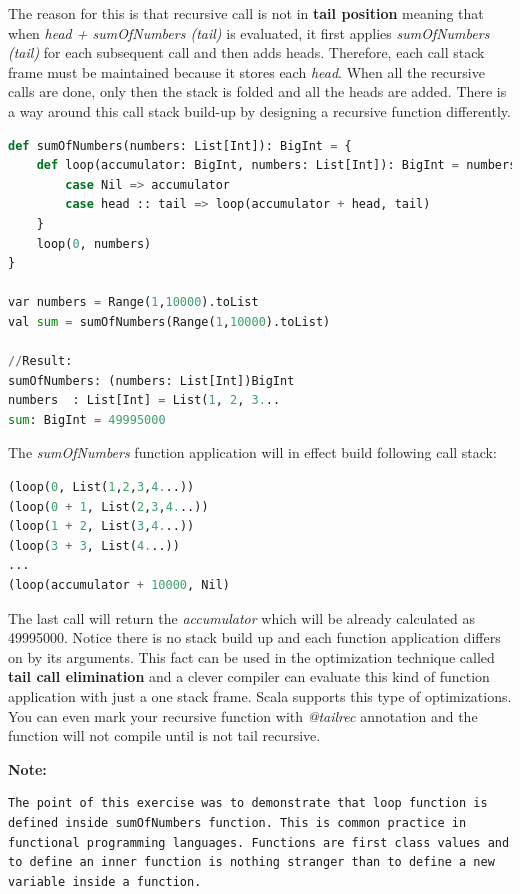 \documentclass[12pt,twoside,a4paper]{report}
\begin{document}
The reason for this is that recursive call is not in \textbf{tail position} meaning that when \emph{head + sumOfNumbers (tail)} is evaluated, it first applies \emph{sumOfNumbers (tail)} for each subsequent call and then adds heads. Therefore, each call stack frame must be maintained because it stores each \emph{head}. When all the recursive calls are done, only then the stack is folded and all the heads are added. There is a way around this call stack build-up by designing a recursive function differently.
\begin{lstlisting}[language=python]
def sumOfNumbers(numbers: List[Int]): BigInt = {
    def loop(accumulator: BigInt, numbers: List[Int]): BigInt = numbers match {
        case Nil => accumulator
        case head :: tail => loop(accumulator + head, tail)
    }
    loop(0, numbers)
}
  
var numbers = Range(1,10000).toList
val sum = sumOfNumbers(Range(1,10000).toList)

//Result:
sumOfNumbers: (numbers: List[Int])BigInt
numbers  : List[Int] = List(1, 2, 3...
sum: BigInt = 49995000
\end{lstlisting}

The \emph{sumOfNumbers} function application will in effect build following call stack:
\begin{lstlisting}[language=python]
(loop(0, List(1,2,3,4...))
(loop(0 + 1, List(2,3,4...))
(loop(1 + 2, List(3,4...))
(loop(3 + 3, List(4...))
...
(loop(accumulator + 10000, Nil)
\end{lstlisting}

The last call will return the \emph{accumulator} which will be already calculated as 49995000. Notice there is no stack build up and each function application differs on by its arguments. This fact can be used in the optimization technique called \textbf{tail call elimination} and a clever compiler can evaluate this kind of function application with just a one stack frame. Scala supports this type of optimizations. You can even mark your recursive function with \emph{@tailrec} annotation and the function will not compile until is not tail recursive.

\textbf{Note:}
\begin{lstlisting}
The point of this exercise was to demonstrate that loop function is defined inside sumOfNumbers function. This is common practice in functional programming languages. Functions are first class values and to define an inner function is nothing stranger than to define a new variable inside a function.
\end{lstlisting}
\end{document}
